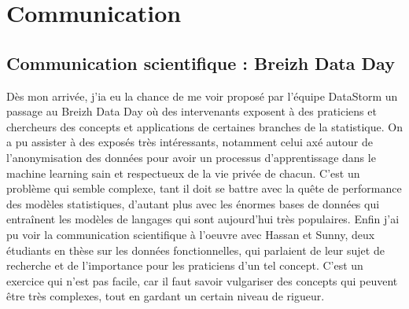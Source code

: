 \section{Communication}

\subsection{Communication scientifique : Breizh Data Day}

Dès mon arrivée, j'ia eu la chance de me voir proposé par l'équipe DataStorm un passage au Breizh Data Day où des intervenants exposent à des praticiens et chercheurs des concepts et applications de certaines branches de la statistique. On a pu assister à des exposés très intéressants, notamment celui axé autour de l'anonymisation des données pour avoir un processus d'apprentissage dans le machine learning sain et respectueux de la vie privée de chacun. C'est un problème qui semble complexe, tant il doit se battre avec la quête de performance des modèles statistiques, d'autant plus avec les énormes bases de données qui entraînent les modèles de langages qui sont aujourd'hui très populaires. Enfin j'ai pu voir la communication scientifique à l'oeuvre avec Hassan et Sunny, deux étudiants en thèse sur les données fonctionnelles, qui parlaient de leur sujet de recherche et de l'importance pour les praticiens d'un tel concept. C'est un exercice qui n'est pas facile, car il faut savoir vulgariser des concepts qui peuvent être très complexes, tout en gardant un certain niveau de rigueur.  



